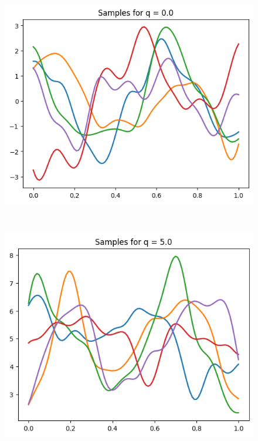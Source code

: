 \begin{figure}[p]
  \centering
  \begin{subcaptionblock}{.5\textwidth}
    \centering
    \includegraphics[width=\textwidth]{./figures/gp_constr_q0.png}
  \end{subcaptionblock}
  \\
  \begin{subcaptionblock}{.5\textwidth}
    \centering
    \includegraphics[width=\textwidth]{./figures/gp_constr_q5.png}
  \end{subcaptionblock}
  \\

\end{figure}
